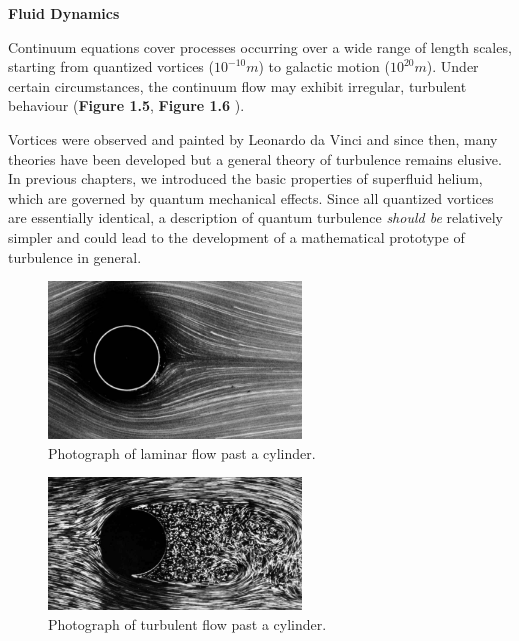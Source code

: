 \newpage

{\Huge \bfseries Fluid Dynamics}
\vspace{1cm}

Continuum equations cover processes occurring over a wide range of length scales, starting from quantized vortices ($10^{-10}\unit{m}$) to galactic motion ($10^{20}\unit{m}$). Under certain circumstances, the continuum flow may exhibit irregular, turbulent behaviour ({\sffamily\textbf{Figure 1.5}}, {\sffamily\textbf{Figure 1.6}} \cite{turbulence}).

Vortices were observed and painted by Leonardo da Vinci and since then, many theories have been developed but a general theory of turbulence remains elusive. In previous chapters, we introduced the basic properties of superfluid helium, which are governed by quantum mechanical effects. Since all quantized vortices are essentially identical, a description of quantum turbulence \textit{should be} relatively simpler and could lead to the development of a mathematical prototype of turbulence in general.

\begin{figure}[h]
\centering
\includegraphics[width=0.6\textwidth]{graphics/laminar}
\caption{Photograph of laminar flow past a cylinder.}
\end{figure}

\begin{figure}[h]
\centering
\includegraphics[width=0.6\textwidth]{graphics/turbulent}
\caption{Photograph of turbulent flow past a cylinder.}
\end{figure}

